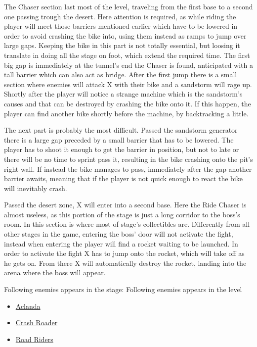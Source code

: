 The Chaser section last most of the level, traveling from the first base to a second one passing trough the desert. Here attention is required, as while riding the player will meet those barriers mentioned earlier which have to be lowered in order to avoid crashing the bike into, using them instead as ramps to jump over large gaps. Keeping the bike in this part is not totally essential, but loosing it translate in doing all the stage on foot, which extend the required time. The first big gap is immediately at the tunnel's end the Chaser is found, anticipated with a tall barrier which can also act as bridge. After the first jump there is a small section where enemies will attack X with their bike and a sandstorm will rage up. Shortly after the player will notice a strange machine which is the sandstorm's causes and that can be destroyed by crashing the bike onto it. If this happen, the player can find another bike shortly before the machine, by backtracking a little. 

The next part is probably the most difficult. Passed the sandstorm generator there is a large gap preceded by a small barrier that has to be lowered. The player has to shoot it enough to get the barrier in position, but not to late or there will be no time to sprint pass it, resulting in the bike crashing onto the pit's right wall. If instead the bike manages to pass, immediately after the gap another barrier awaits, meaning that if the player is not quick enough to react the bike will inevitably crash.

Passed the desert zone, X will enter into a second base. Here the Ride Chaser is almost useless, as this portion of the stage is just a long corridor to the boss's room. In this section is  where most of stage's collectibles are. Differently from all other stages in the game, entering the boss' door will not activate the fight, instead when entering the player will find a rocket waiting to be launched. In order to activate the fight X has to jump onto the rocket, which will take off as he gets on. From there X will automatically destroy the rocket, landing into the arena where the boss will appear.

Following enemies appears in the stage:
Following enemies appears in the level~\cite{wiki:Desert_base}
\begin{itemize}
	\item \hyperlink{enem:Aclanda}{Aclanda}
	\item \hyperlink{enem:Crash_Roader}{Crash Roader}
	\item \hyperlink{enem:Road_Riders}{Road Riders}
\end{itemize}

